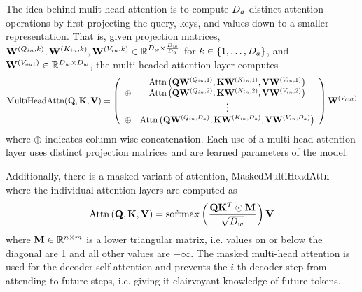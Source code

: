   The idea behind mulit-head attention is to compute ${D_a}$ distinct
  attention operations by first projecting the query, keys, and values
  down to a smaller representation. That is, given projection
  matrices, $\mathbf{W}^{(Q_{in},k)}, \mathbf{W}^{(K_{in},k)}, \mathbf{W}^{(V_{in},k)} \in \mathbb{R}^{D_{w} \times \frac{D_{w}}{{D_a}}}$ for $k \in \{1,\ldots,{D_a}\}$, and $\mathbf{W}^{(V_{out})} \in \mathbb{R}^{D_{w} \times D_{w}}$,
the  multi-headed attention layer computes
\[ \operatorname{MultiHeadAttn}(\mathbf{Q}, \mathbf{K}, \mathbf{V}) = \left(\begin{array}{lc}
            &\operatorname{Attn}\left(\mathbf{Q}\mathbf{W}^{(Q_{in},1)},  
                 \mathbf{K}\mathbf{W}^{(K_{in},1)}, \mathbf{V}\mathbf{W}^{(V_{in},1)}\right)\\
              \oplus &   
                  \operatorname{Attn}\left(\mathbf{Q}\mathbf{W}^{(Q_{in},2)}, 
              \mathbf{K}\mathbf{W}^{(K_{in},2)}, \mathbf{V}\mathbf{W}^{(V_{in},2)}\right)\\
              & \vdots \\
              \oplus & 
            \operatorname{Attn}\left(\mathbf{Q}\mathbf{W}^{(Q_{in},{D_a})},  
                 \mathbf{K}\mathbf{W}^{(K_{in},{D_a})}, \mathbf{V}\mathbf{W}^{(V_{in},{D_a})}\right)\\
        \end{array}\right) \mathbf{W}^{(V_{out})}
 \]
  where $\oplus$ indicates column-wise concatenation. Each use of a
  multi-head attention layer uses distinct projection matrices
  and are learned parameters of the model.

%
%


Additionally, there is a masked variant of attention, $\operatorname{MaskedMultiHeadAttn}$
  where the individual attention layers are computed as
  \[\operatorname{Attn}\left(\mathbf{Q}, \mathbf{K}, \mathbf{V}\right) = \operatorname*{softmax}\left(\frac{\mathbf{Q} \mathbf{K}^T \odot \mathbf{M} }{\sqrt{D_{w}}} \right)\mathbf{V} \]
where $\mathbf{M} \in \mathbb{R}^{n \times m}$ 
 is a lower triangular matrix, i.e. values on or below the diagonal are 1
  and all other values are $-\infty$.  The masked multi-head attention
  is used for the decoder self-attention and prevents the $i$-th decoder
  step from attending to future steps, i.e. giving it clairvoyant knowledge 
  of future tokens.

